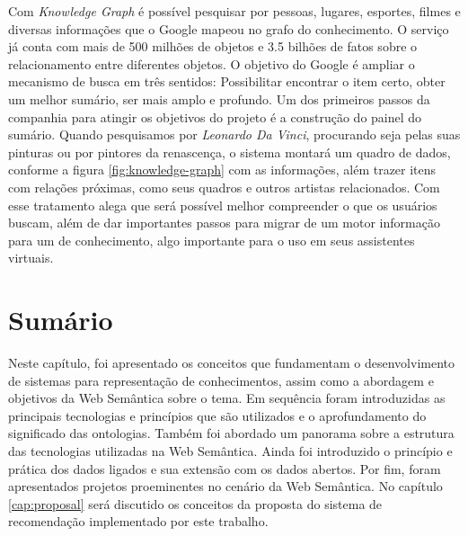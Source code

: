 Com \textit{Knowledge Graph} é possível pesquisar por pessoas, lugares, esportes, filmes e diversas informações que o Google mapeou no grafo do conhecimento. O serviço já conta com mais de 500 milhões de objetos e 3.5 bilhões de fatos sobre o relacionamento entre diferentes objetos. O objetivo do Google é ampliar o mecanismo de busca em três sentidos: Possibilitar encontrar o item certo, obter um melhor sumário, ser mais amplo e profundo. Um dos primeiros passos da companhia para atingir os objetivos do projeto é a construção do painel do sumário. Quando pesquisamos por \textit{Leonardo Da Vinci}, procurando seja pelas suas pinturas ou por pintores da renascença, o sistema montará um quadro de dados, conforme a figura \ref{fig:knowledge-graph} com as informações, além trazer itens com relações próximas, como seus quadros e outros artistas relacionados. Com esse tratamento \cite{GoogleKnowledge} alega que será possível melhor compreender o que os usuários buscam, além de dar importantes passos para migrar de um motor informação para um de conhecimento, algo importante para o uso em seus assistentes virtuais.

\section{Sumário}

Neste capítulo, foi apresentado os conceitos que fundamentam o desenvolvimento de sistemas para representação de conhecimentos, assim como a abordagem e objetivos da Web Semântica sobre o tema. Em sequência foram introduzidas as principais tecnologias e princípios que são utilizados e o aprofundamento do significado das ontologias. Também foi abordado um panorama sobre a estrutura das tecnologias utilizadas na Web Semântica. Ainda foi introduzido o princípio e prática dos dados ligados e sua extensão com os dados abertos. Por fim, foram apresentados projetos proeminentes no cenário da Web Semântica. No capítulo \ref{cap:proposal} será discutido os conceitos da proposta do sistema de recomendação implementado por este trabalho.

\label{cap:semantic_web}

